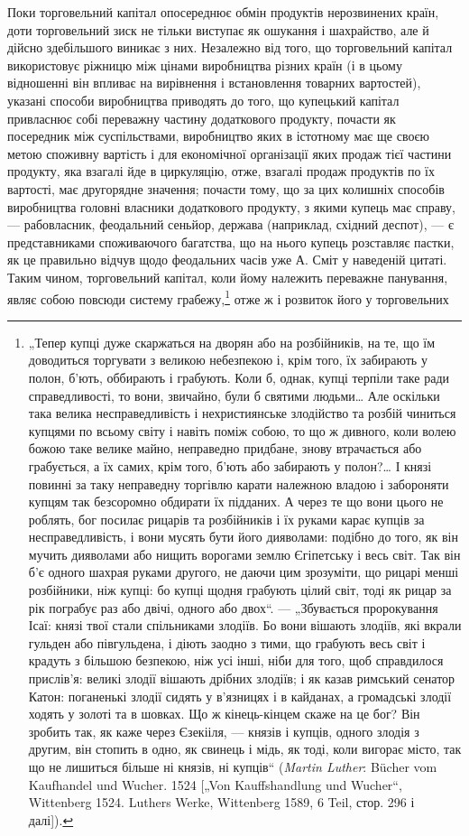 
Поки торговельний капітал опосереднює обмін продуктів
нерозвинених країн, доти торговельний зиск не тільки виступає
як ошукання і шахрайство, але й дійсно здебільшого виникає з них.
Незалежно від того, що торговельний капітал використовує ріжницю
між цінами виробництва різних країн (і в цьому відношенні
він впливає на вирівнення і встановлення товарних вартостей),
указані способи виробництва приводять до того, що
купецький капітал привласнює собі переважну частину додаткового
продукту, почасти як посередник між суспільствами, виробництво
яких в істотному має ще своєю метою споживну вартість
і для економічної організації яких продаж тієї частини продукту,
яка взагалі йде в циркуляцію, отже, взагалі продаж продуктів по
їх вартості, має другорядне значення; почасти тому, що за цих
колишніх способів виробництва головні власники додаткового
продукту, з якими купець має справу, — рабовласник, феодальний
сеньйор, держава (наприклад, східний деспот), — є представниками
споживаючого багатства, що на нього купець розставляє
пастки, як це правильно відчув щодо феодальних часів
уже А. Сміт у наведеній цитаті. Таким чином, торговельний капітал,
коли йому належить переважне панування, являє собою повсюди
систему грабежу,\footnote{
„Тепер купці дуже скаржаться на дворян або на розбійників, на те, що
їм доводиться торгувати з великою небезпекою і, крім того, їх забирають у полон,
б’ють, оббирають і грабують. Коли б, однак, купці терпіли таке ради
справедливості, то вони, звичайно, були б святими людьми\dots{} Але оскільки така
велика несправедливість і нехристиянське злодійство та розбій чиниться купцями
по всьому світу і навіть поміж собою, то що ж дивного, коли волею
божою таке велике майно, неправедно придбане, знову втрачається або
грабується, а їх самих, крім того, б’ють або забирають у полон?\dots{} І князі
повинні за таку неправедну торгівлю карати належною владою і забороняти
купцям так безсоромно обдирати їх підданих. А через те що вони цього не
роблять, бог посилає рицарів та розбійників і їх руками карає купців за несправедливість,
і вони мусять бути його дияволами: подібно до того, як він мучить
дияволами або нищить ворогами землю Єгіпетську і весь світ. Так він б’є
одного шахрая руками другого, не даючи цим зрозуміти, що рицарі менші
розбійники, ніж купці: бо купці щодня грабують цілий світ, тоді як рицар за рік
пограбує раз або двічі, одного або двох“. — „Збувається пророкування Ісаї:
князі твої стали спільниками злодіїв. Бо вони вішають злодіїв, які вкрали гульден
або півгульдена, і діють заодно з тими, що грабують весь світ і крадуть
з більшою безпекою, ніж усі інші, ніби для того, щоб справдилося прислів’я:
великі злодії вішають дрібних злодіїв; і як казав римський сенатор Катон: поганенькі
злодії сидять у в’язницях і в кайданах, а громадські злодії ходять
у золоті та в шовках. Що ж кінець-кінцем скаже на це бог? Він зробить так,
як каже через Єзекііля, — князів і купців, одного злодія з другим, він стопить
в одно, як свинець і мідь, як тоді, коли вигорає місто, так що не лишиться більше
ні князів, ні купців“ (\emph{Martin Luther}: Bücher vom Kaufhandel und Wucher. 1524
[„Von Kauffshandlung und Wucher“, Wittenberg 1524. Luthers Werke, Wittenberg
1589, 6 Teil, стор. 296 і далі]).
} отже ж і розвиток його у торговельних
